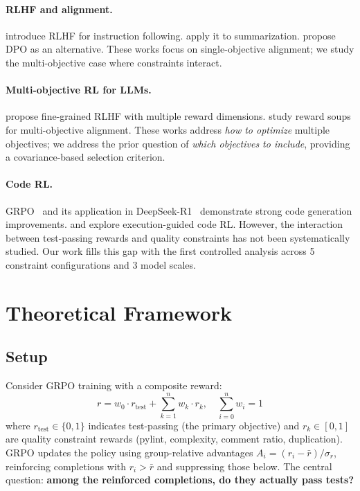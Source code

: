 \documentclass{article}
\begin{document}
\paragraph{RLHF and alignment.} \citet{ouyang2022training} introduce RLHF for instruction following. \citet{stiennon2020learning} apply it to summarization. \citet{rafailov2023direct} propose DPO as an alternative. These works focus on single-objective alignment; we study the multi-objective case where constraints interact.

\paragraph{Multi-objective RL for LLMs.} \citet{wu2024fine} propose fine-grained RLHF with multiple reward dimensions. \citet{rame2024rewarded} study reward soups for multi-objective alignment. These works address \emph{how to optimize} multiple objectives; we address the prior question of \emph{which objectives to include}, providing a covariance-based selection criterion.

\paragraph{Code RL.} GRPO~\citep{shao2024deepseekmath} and its application in DeepSeek-R1~\citep{deepseek2025r1} demonstrate strong code generation improvements. \citet{le2022coderl} and \citet{shojaee2023execution} explore execution-guided code RL. However, the interaction between test-passing rewards and quality constraints has not been systematically studied. Our work fills this gap with the first controlled analysis across 5 constraint configurations and 3 model scales.

\section{Theoretical Framework}
\label{sec:theory}

\subsection{Setup}

Consider GRPO training with a composite reward:
\begin{equation}
    r = w_0 \cdot r_{\text{test}} + \sum_{k=1}^{n} w_k \cdot r_k, \quad \sum_{i=0}^{n} w_i = 1
\end{equation}
where $r_{\text{test}} \in \{0, 1\}$ indicates test-passing (the primary objective) and $r_k \in [0,1]$ are quality constraint rewards (pylint, complexity, comment ratio, duplication). GRPO updates the policy using group-relative advantages $A_i = (r_i - \bar{r})/\sigma_r$, reinforcing completions with $r_i > \bar{r}$ and suppressing those below. The central question: \textbf{among the reinforced completions, do they actually pass tests?}
\end{document}
